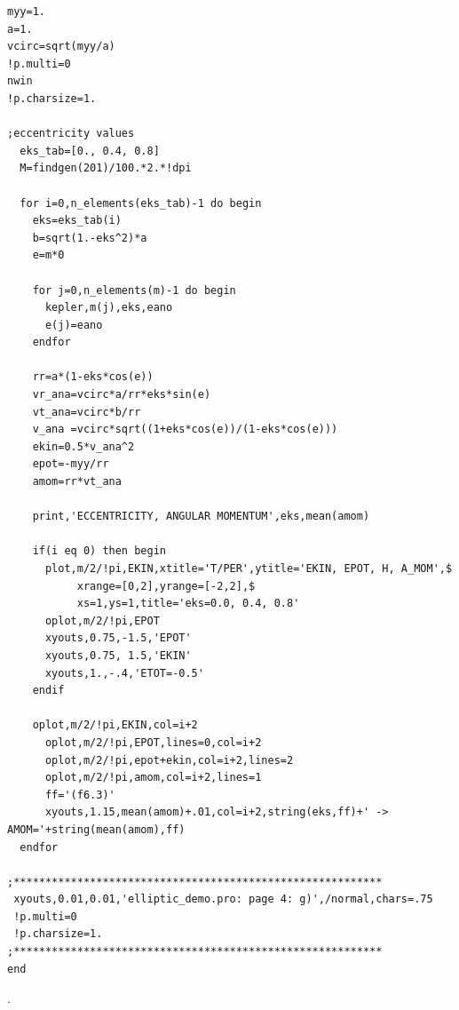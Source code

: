 \documentclass[a4paper,12pt]{article}
\def\black{\color{RGBblack}}
\begin{document}
{{{{{\begin{verbatim}
myy=1.
a=1.
vcirc=sqrt(myy/a)
!p.multi=0
nwin
!p.charsize=1.

;eccentricity values
  eks_tab=[0., 0.4, 0.8]
  M=findgen(201)/100.*2.*!dpi

  for i=0,n_elements(eks_tab)-1 do begin
    eks=eks_tab(i)
    b=sqrt(1.-eks^2)*a
    e=m*0

    for j=0,n_elements(m)-1 do begin
      kepler,m(j),eks,eano
      e(j)=eano
    endfor

    rr=a*(1-eks*cos(e))    
    vr_ana=vcirc*a/rr*eks*sin(e)
    vt_ana=vcirc*b/rr
    v_ana =vcirc*sqrt((1+eks*cos(e))/(1-eks*cos(e)))	
    ekin=0.5*v_ana^2
    epot=-myy/rr   	
    amom=rr*vt_ana
 
    print,'ECCENTRICITY, ANGULAR MOMENTUM',eks,mean(amom)

    if(i eq 0) then begin
      plot,m/2/!pi,EKIN,xtitle='T/PER',ytitle='EKIN, EPOT, H, A_MOM',$
           xrange=[0,2],yrange=[-2,2],$
           xs=1,ys=1,title='eks=0.0, 0.4, 0.8'
      oplot,m/2/!pi,EPOT
      xyouts,0.75,-1.5,'EPOT'
      xyouts,0.75, 1.5,'EKIN'
      xyouts,1.,-.4,'ETOT=-0.5'
    endif

    oplot,m/2/!pi,EKIN,col=i+2
      oplot,m/2/!pi,EPOT,lines=0,col=i+2
      oplot,m/2/!pi,epot+ekin,col=i+2,lines=2        
      oplot,m/2/!pi,amom,col=i+2,lines=1
      ff='(f6.3)'
      xyouts,1.15,mean(amom)+.01,col=i+2,string(eks,ff)+' -> AMOM='+string(mean(amom),ff)
  endfor

;**********************************************************
 xyouts,0.01,0.01,'elliptic_demo.pro: page 4: g)',/normal,chars=.75
 !p.multi=0
 !p.charsize=1.
;**********************************************************
end

\end{verbatim}} \black
\newpage
.

\vspace{-15cm}

}}}}
\end{document}
